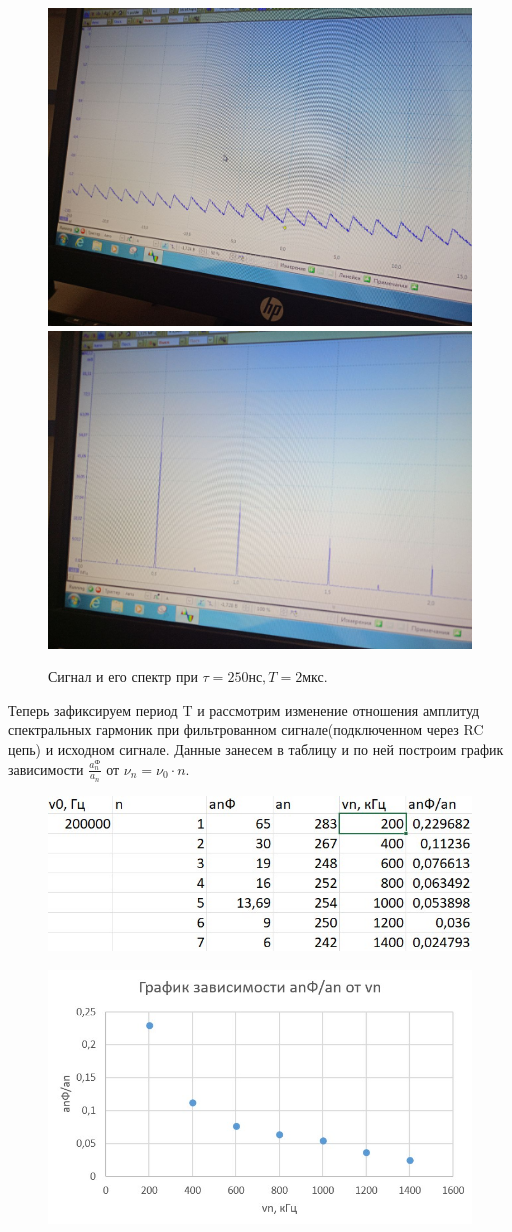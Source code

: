 \documentclass[a4paper,12pt]{article}
\begin{document}
\begin{figure}[H]
    \includegraphics[width=.5\textwidth]{E.30.2.graph}
    \includegraphics[width=.5\textwidth]{E.30.2.spectr}
    \caption{Сигнал и его спектр при $\tau = 250 \text{нс}, T = 2 \text{мкс}.$}\label{fig:foobar}
\end{figure}

Теперь зафиксируем период T и рассмотрим изменение отношения амплитуд спектральных гармоник при фильтрованном сигнале(подключенном через RC цепь) и исходном сигнале. Данные занесем в таблицу и по ней построим график зависимости $\frac{a_n^\text{Ф}}{a_n}$ от $\nu_n = \nu_0 \cdot n$.

\begin{figure}[H]
	\begin{center}
    \includegraphics[width=.6\textwidth]{E.33.tabl}
\label{fig:foobar}
	\end{center}
\end{figure}

\begin{figure}[H]
	\begin{center}
    \includegraphics[width=.8\textwidth]{E.33.graph}
\label{fig:foobar}
	\end{center}
\end{figure}
\end{document}
